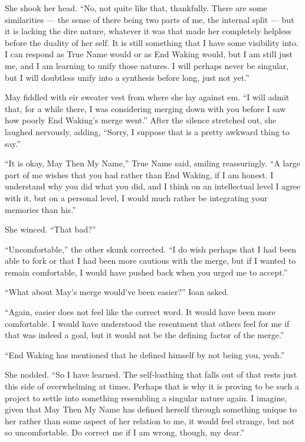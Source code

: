 She shook her head. ``No, not quite like that, thankfully. There are some similarities — the sense of there being two parts of me, the internal split — but it is lacking the dire nature, whatever it was that made her completely helpless before the duality of her self. It is still something that I have some visibility into. I can respond as True Name would or as End Waking would, but I am still just me, and I am learning to unify those natures. I will perhaps never be singular, but I will doubtless unify into a synthesis before long, just not yet.''

May fiddled with eir sweater vest from where she lay against em. ``I will admit that, for a while there, I was considering merging down with you before I saw how poorly End Waking's merge went.'' After the silence stretched out, she laughed nervously, adding, ``Sorry, I suppose that is a pretty awkward thing to say.''

``It is okay, May Then My Name,'' True Name said, smiling reassuringly. ``A large part of me wishes that you had rather than End Waking, if I am honest. I understand why you did what you did, and I think on an intellectual level I agree with it, but on a personal level, I would much rather be integrating your memories than his.''

She winced. ``That bad?''

``Uncomfortable,'' the other skunk corrected. ``I do wish perhaps that I had been able to fork or that I had been more cautious with the merge, but if I wanted to remain comfortable, I would have pushed back when you urged me to accept.''

``What about May's merge would've been easier?'' Ioan asked.

``Again, easier does not feel like the correct word. It would have been more comfortable. I would have understood the resentment that others feel for me if that was indeed a goal, but it would not be the defining factor of the merge.''

``End Waking has mentioned that he defined himself by not being you, yeah.''

She nodded. ``So I have learned. The self-loathing that falls out of that rests just this side of overwhelming at times. Perhaps that is why it is proving to be such a project to settle into something resembling a singular nature again. I imagine, given that May Then My Name has defined herself through something unique to her rather than some aspect of her relation to me, it would feel strange, but not so uncomfortable. Do correct me if I am wrong, though, my dear.''

